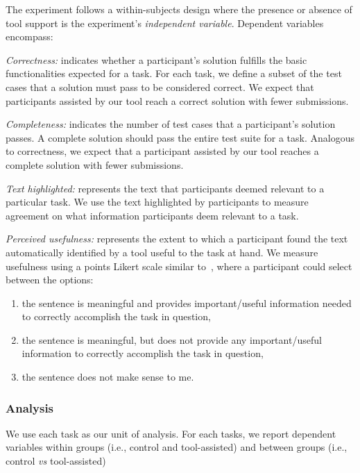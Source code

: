 The experiment follows a within-subjects design where the presence or absence of tool support is the experiment's \textit{independent variable}.
Dependent variables encompass:


\textit{Correctness:}  indicates whether a participant's solution fulfills the basic functionalities expected for a task. For each task, we define a subset of the test cases that a solution must pass to be considered correct. We expect that participants assisted by our tool reach a correct solution with fewer submissions. 


\textit{Completeness:} indicates the number of test cases that a participant's solution passes. 
A complete solution should pass the entire test suite for a task. Analogous to correctness, we expect that a participant assisted by our tool reaches a complete solution with fewer submissions.


\textit{Text highlighted:} represents the text that participants deemed relevant to a particular task. We use the text highlighted by participants to measure agreement on what information participants deem relevant to a task.



\textit{Perceived usefulness:} represents the extent to which a participant found the text automatically identified by a tool useful to the task at hand. We measure usefulness using a  points Likert scale similar to~\cite{nadi2020}, where a participant could select between the options:


\begin{enumerate}[label=\textit{\alph*.}]
\item the sentence is meaningful
and provides important/useful information needed to
correctly accomplish the task in question,
\item the
sentence is meaningful, but does not provide any important/useful information to correctly accomplish the task in question,
\item the sentence does not make sense to me.
\end{enumerate}




\subsubsection{Analysis}


We use each task as our unit of analysis. For each tasks, we report dependent variables within groups (i.e., control and tool-assisted) and between groups (i.e., control \textit{vs} tool-assisted)



